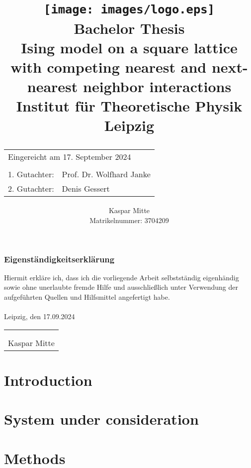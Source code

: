 \documentclass[openany]{report}
\title{
        {\texttt{[image: images/logo.eps]}} \\
        \vspace{1cm}
        {\large Bachelor Thesis} \\ 
        {Ising model on a square lattice with competing nearest and next-nearest neighbor interactions} \\
        {\large  Institut für Theoretische Physik Leipzig} \\
        \vspace{7cm} 
        \begin{table}[b]
          \begin{tabular}{ll}
            \multicolumn{2}{l}{\footnotesize{Eingereicht am 17. September 2024}} \\
            \multicolumn{2}{l}{} \\
            1. Gutachter: & Prof. Dr. Wolfhard Janke \\
            2. Gutachter: & Denis Gessert \\
          \end{tabular}
        \end{table}
      }
\author{Kaspar Mitte \\ Matrikelnummer: 3704209}
\date{}
\begin{document}
\maketitle %



\newpage

\subsection*{Eigenständigkeitserklärung}
Hiermit erkläre ich, dass ich die vorliegende Arbeit selbstständig eigenhändig sowie ohne unerlaubte fremde Hilfe und ausschließlich 
unter Verwendung der aufgeführten Quellen und Hilfsmittel angefertigt habe.\\
\\
Leipzig, den 17.09.2024 \\
\begin{tabular}{m{4cm}}
  \\
  \\
  \\
  \hline
  \footnotesize{Kaspar Mitte}
\end{tabular}

\newpage

\begin{abstract}\end{abstract}

\newpage

\tableofcontents


\chapter{Introduction}

  

\chapter{System under consideration}

  

  

\chapter{Methods}
\end{document}
